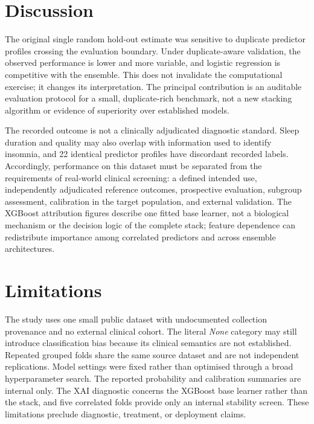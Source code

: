 \section{Discussion}
\label{sec:discussion-revision}

The original single random hold-out estimate was sensitive to duplicate predictor profiles crossing the evaluation boundary. Under duplicate-aware validation, the observed performance is lower and more variable, and logistic regression is competitive with the ensemble. This does not invalidate the computational exercise; it changes its interpretation. The principal contribution is an auditable evaluation protocol for a small, duplicate-rich benchmark, not a new stacking algorithm or evidence of superiority over established models.

The recorded outcome is not a clinically adjudicated diagnostic standard. Sleep duration and quality may also overlap with information used to identify insomnia, and 22 identical predictor profiles have discordant recorded labels. Accordingly, performance on this dataset must be separated from the requirements of real-world clinical screening: a defined intended use, independently adjudicated reference outcomes, prospective evaluation, subgroup assessment, calibration in the target population, and external validation. The XGBoost attribution figures describe one fitted base learner, not a biological mechanism or the decision logic of the complete stack; feature dependence can redistribute importance among correlated predictors and across ensemble architectures.

\section{Limitations}
\label{sec:limitations-revision}

The study uses one small public dataset with undocumented collection provenance and no external clinical cohort. The literal \emph{None} category may still introduce classification bias because its clinical semantics are not established. Repeated grouped folds share the same source dataset and are not independent replications. Model settings were fixed rather than optimised through a broad hyperparameter search. The reported probability and calibration summaries are internal only. The XAI diagnostic concerns the XGBoost base learner rather than the stack, and five correlated folds provide only an internal stability screen. These limitations preclude diagnostic, treatment, or deployment claims.


